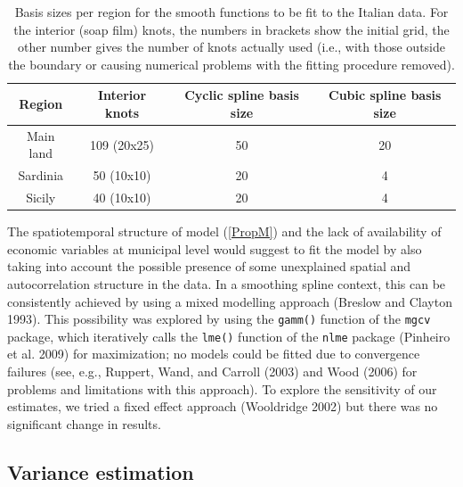 \documentclass[10pt] {article}
\theoremstyle{definition}
\theoremstyle{plain}
\begin{document}
\begin{table}[htbp]
\centering
\begin{tabular}{c c c c}\\
\hline
\hline
Region & Interior knots & Cyclic spline basis size & Cubic spline basis size\\
\hline
Main land & 109 (20x25) & 50 & 20\\
Sardinia & 50 (10x10) & 20 & 4\\
Sicily & 40 (10x10) & 20 & 4\\
\hline
\hline
\end{tabular}
\caption{Basis sizes per region for the smooth functions to be fit to the Italian data. For the interior (soap film) knots, the numbers in brackets show the initial grid, the other number gives the number of knots actually used (i.e., with those outside the boundary or causing numerical problems with the fitting procedure removed).}
\label{soap-basis-table}
\end{table}

The spatiotemporal structure of model (\ref{PropM}) and the lack of availability of economic variables at municipal level would suggest to fit the model by also taking into account the possible presence of some unexplained spatial and autocorrelation structure in the data. In a smoothing spline context, this can be consistently achieved by using a mixed modelling approach (Breslow and Clayton 1993). This possibility was explored by using the \texttt{gamm()} function of the \texttt{mgcv} package, which iteratively calls the \texttt{lme()} function of the \texttt{nlme} package (Pinheiro et al. 2009) for maximization; no models could be fitted due to convergence failures (see, e.g., Ruppert, Wand, and Carroll (2003) and Wood (2006) for problems and limitations with this approach). To explore the sensitivity of our estimates, we tried a fixed effect approach (Wooldridge 2002) but there was no significant change in results.

\subsection{Variance estimation \label{VE}}
\end{document}
